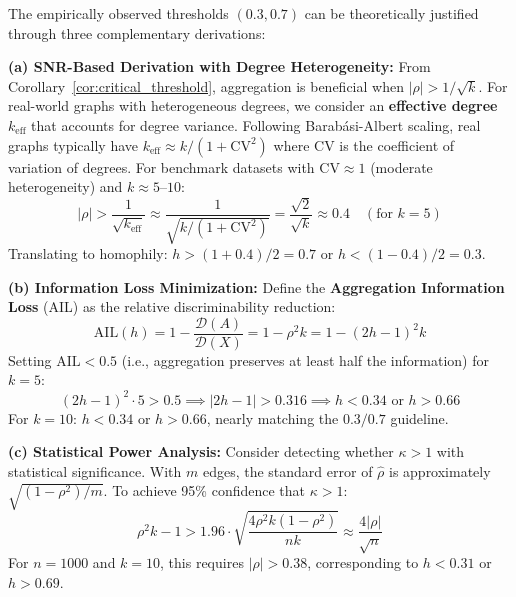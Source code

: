 
\begin{remark}[Theoretical Justification for $h = 0.3/0.7$ Thresholds]
\label{rem:threshold_theory}
The empirically observed thresholds $(0.3, 0.7)$ can be theoretically justified through three complementary derivations:

\textbf{(a) SNR-Based Derivation with Degree Heterogeneity:}
From Corollary~\ref{cor:critical_threshold}, aggregation is beneficial when $|\rho| > 1/\sqrt{k}$. For real-world graphs with heterogeneous degrees, we consider an \textbf{effective degree} $k_{\mathrm{eff}}$ that accounts for degree variance. Following Barab\'{a}si-Albert scaling, real graphs typically have $k_{\mathrm{eff}} \approx k/(1 + \mathrm{CV}^2)$ where $\mathrm{CV}$ is the coefficient of variation of degrees. For benchmark datasets with $\mathrm{CV} \approx 1$ (moderate heterogeneity) and $k \approx 5$--$10$:
\begin{equation}
    |\rho| > \frac{1}{\sqrt{k_{\mathrm{eff}}}} \approx \frac{1}{\sqrt{k/(1+\mathrm{CV}^2)}} = \frac{\sqrt{2}}{\sqrt{k}} \approx 0.4 \quad (\text{for } k = 5)
\end{equation}
Translating to homophily: $h > (1 + 0.4)/2 = 0.7$ or $h < (1 - 0.4)/2 = 0.3$.

\textbf{(b) Information Loss Minimization:}
Define the \textbf{Aggregation Information Loss} (AIL) as the relative discriminability reduction:
\begin{equation}
    \mathrm{AIL}(h) = 1 - \frac{\mathcal{D}(A)}{\mathcal{D}(X)} = 1 - \rho^2 k = 1 - (2h-1)^2 k
\end{equation}
Setting $\mathrm{AIL} < 0.5$ (i.e., aggregation preserves at least half the information) for $k = 5$:
\begin{equation}
    (2h-1)^2 \cdot 5 > 0.5 \implies |2h-1| > 0.316 \implies h < 0.34 \text{ or } h > 0.66
\end{equation}
For $k = 10$: $h < 0.34$ or $h > 0.66$, nearly matching the $0.3/0.7$ guideline.

\textbf{(c) Statistical Power Analysis:}
Consider detecting whether $\kappa > 1$ with statistical significance. With $m$ edges, the standard error of $\hat{\rho}$ is approximately $\sqrt{(1-\rho^2)/m}$. To achieve 95\% confidence that $\kappa > 1$:
\begin{equation}
    \rho^2 k - 1 > 1.96 \cdot \sqrt{\frac{4\rho^2 k (1-\rho^2)}{nk}} \approx \frac{4|\rho|}{\sqrt{n}}
\end{equation}
For $n = 1000$ and $k = 10$, this requires $|\rho| > 0.38$, corresponding to $h < 0.31$ or $h > 0.69$.


\end{remark}
